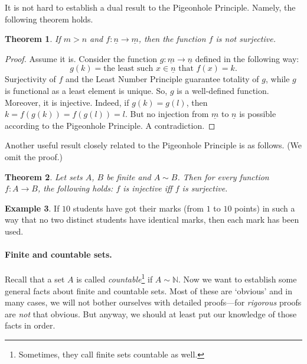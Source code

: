 \documentclass[12pt,notitlepage]{article}
\theoremstyle{plain}
\newtheorem{thm}{Theorem}[section]
\theoremstyle{definition}
\newtheorem{exm}[thm]{Example}
\theoremstyle{plain}
\newcommand{\N}{\mathbb{N}}
\newcommand{\ul}[1]{\underline{#1}}
\newcommand{\1}{\mathbf{1}}
\newcommand{\0}{\mathbf{0}}
\newcommand{\mcomm}[1]{}
\begin{document}
It is not hard to establish a dual result to the Pigeonhole Principle. Namely, the following theorem holds.
\begin{thm}\label{L10:pigeon_dual}
If $m > n$ and $f\colon \ul{n} \to \ul{m}$, then the function $f$ is not surjective.
\end{thm}
\begin{proof}
Assume it is. Consider the function $g\colon \ul{m} \to \ul{n}$ defined in the following way:
$$g(k) = \mbox{the least such $x \in \ul{n}$ that } f(x) = k.$$
Surjectivity of $f$ and the Least Number Principle guarantee totality of $g$, while $g$ is functional as a least element is unique. So, $g$ is a well-defined function. Moreover, it is injective. Indeed, if $g(k) = g(l)$, then $k = f(g(k)) = f(g(l)) = l$. But no injection from $\ul{m}$ to $\ul{n}$ is possible according to the Pigeonhole Principle. A contradiction.
\end{proof}

Another useful result closely related to the Pigeonhole Principle is as follows. (We omit the proof.)
\begin{thm}\label{L10:fin_sur_in}
Let sets $A$, $B$ be finite and $A \sim B$. Then for every function $f\colon A \to B$, the following holds: $f$ is injective iff $f$ is surjective.
\end{thm}
\mcomm{In fact, one can easily prove that every injection $A \to B$ is surjective under assumption that a proper subset of a finite set is smaller than that set. The latter statement follows from the  Rule of Sum, which we prove below. A forward reference is unwanted here, so we omit the proof, which can be postponed for a seminar class, though. Another---far less elegant---way to prove surjectivity is similar to that of Theorem~\ref{L10:dirichlet}. Next, one can prove injectivity of every surjection $f\colon A \to B$ by constructing its right inverse $g$ (like we have done when proving Theorem~\ref{L10:pigeon_dual}), which is clearly injective. By the first claim, $g$ must be bijective and $f = g^{-1}$.}
\begin{exm}
If $10$ students have got their marks (from $1$ to $10$ points) in such a way that no two distinct students have identical marks, then each mark has been used.
\end{exm}

\paragraph{Finite and countable sets.} Recall that a set $A$ is  called \emph{countable}\footnote{Sometimes, they call finite sets countable as well.} if $A \sim \N$. Now we want to establish some general facts about finite and countable sets. Most of these are `obvious' and in many cases, we will not bother ourselves with detailed proofs---for \emph{rigorous} proofs are \emph{not} that obvious. But anyway, we should at least put our knowledge of those facts in order.
\end{document}
